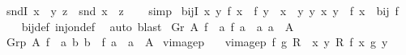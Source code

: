 \begin{isabellebody}
\isamarkupfalse%
\ sndI{\isacharcolon}{\kern0pt}\ {\isachardoublequoteopen}x\ {\isacharequal}{\kern0pt}\ {\isacharparenleft}{\kern0pt}y{\isacharcomma}{\kern0pt}\ z{\isacharparenright}{\kern0pt}\ {\isasymLongrightarrow}\ snd\ x\ {\isacharequal}{\kern0pt}\ z{\isachardoublequoteclose}\isanewline
%
\isadelimproof
\ \ %
\endisadelimproof
%
\isatagproof
{}\isamarkupfalse%
\ simp%
\endisatagproof
{\isafoldproof}%
%
\isadelimproof
\isanewline
%
\endisadelimproof
\isanewline
{}\isamarkupfalse%
\ bijI{\isacharprime}{\kern0pt}{\isacharcolon}{\kern0pt}\ {\isachardoublequoteopen}{\isasymlbrakk}{\isasymAnd}x\ y{\isachardot}{\kern0pt}\ {\isacharparenleft}{\kern0pt}f\ x\ {\isacharequal}{\kern0pt}\ f\ y{\isacharparenright}{\kern0pt}\ {\isacharequal}{\kern0pt}\ {\isacharparenleft}{\kern0pt}x\ {\isacharequal}{\kern0pt}\ y{\isacharparenright}{\kern0pt}{\isacharsemicolon}{\kern0pt}\ {\isasymAnd}y{\isachardot}{\kern0pt}\ {\isasymexists}x{\isachardot}{\kern0pt}\ y\ {\isacharequal}{\kern0pt}\ f\ x{\isasymrbrakk}\ {\isasymLongrightarrow}\ bij\ f{\isachardoublequoteclose}\isanewline
%
\isadelimproof
\ \ %
\endisadelimproof
%
\isatagproof
{}\isamarkupfalse%
\ bij{\isacharunderscore}{\kern0pt}def\ inj{\isacharunderscore}{\kern0pt}on{\isacharunderscore}{\kern0pt}def\ \isamarkupfalse%
\ auto\ blast%
\endisatagproof
{\isafoldproof}%
%
\isadelimproof
\isanewline
%
\endisadelimproof
\isanewline
\isanewline
{}\isamarkupfalse%
\ {\isachardoublequoteopen}Gr\ A\ f\ {\isacharequal}{\kern0pt}\ {\isacharbraceleft}{\kern0pt}{\isacharparenleft}{\kern0pt}a{\isacharcomma}{\kern0pt}\ f\ a{\isacharparenright}{\kern0pt}\ {\isacharbar}{\kern0pt}\ a{\isachardot}{\kern0pt}\ a\ {\isasymin}\ A{\isacharbraceright}{\kern0pt}{\isachardoublequoteclose}\isanewline
\isanewline
{}\isamarkupfalse%
\ {\isachardoublequoteopen}Grp\ A\ f\ {\isacharequal}{\kern0pt}\ {\isacharparenleft}{\kern0pt}{\isasymlambda}a\ b{\isachardot}{\kern0pt}\ b\ {\isacharequal}{\kern0pt}\ f\ a\ {\isasymand}\ a\ {\isasymin}\ A{\isacharparenright}{\kern0pt}{\isachardoublequoteclose}\isanewline
\isanewline
{}\isamarkupfalse%
\ vimage{}p\ \isanewline
\ \ {\isachardoublequoteopen}vimage{}p\ f\ g\ R\ {\isacharequal}{\kern0pt}\ {\isacharparenleft}{\kern0pt}{\isasymlambda}x\ y{\isachardot}{\kern0pt}\ R\ {\isacharparenleft}{\kern0pt}f\ x{\isacharparenright}{\kern0pt}\ {\isacharparenleft}{\kern0pt}g\ y{\isacharparenright}{\kern0pt}{\isacharparenright}{\kern0pt}{\isachardoublequoteclose}\isanewline

\end{isabellebody}
